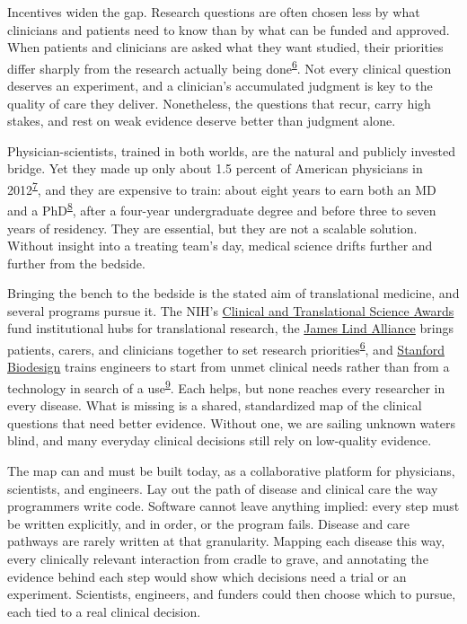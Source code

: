 \documentclass[12pt]{article}
\begin{document}
Incentives widen the gap. Research questions are often chosen less by what clinicians and patients need to know than by what can be funded and approved. When patients and clinicians are asked what they want studied, their priorities differ sharply from the research actually being done\textsuperscript{\hyperlink{ref-crowe2015}{6}}. Not every clinical question deserves an experiment, and a clinician's accumulated judgment is key to the quality of care they deliver. Nonetheless, the questions that recur, carry high stakes, and rest on weak evidence deserve better than judgment alone.

Physician-scientists, trained in both worlds, are the natural and publicly invested bridge. Yet they made up only about 1.5 percent of American physicians in 2012\textsuperscript{\hyperlink{ref-milewicz2015}{7}}, and they are expensive to train: about eight years to earn both an MD and a PhD\textsuperscript{\hyperlink{ref-brass2010}{8}}, after a four-year undergraduate degree and before three to seven years of residency. They are essential, but they are not a scalable solution. Without insight into a treating team's day, medical science drifts further and further from the bedside.

Bringing the bench to the bedside is the stated aim of translational medicine, and several programs pursue it. The NIH's \href{https://ncats.nih.gov/ctsa}{Clinical and Translational Science Awards} fund institutional hubs for translational research, the \href{https://www.jla.nihr.ac.uk/}{James Lind Alliance} brings patients, carers, and clinicians together to set research priorities\textsuperscript{\hyperlink{ref-crowe2015}{6}}, and \href{https://biodesign.stanford.edu/}{Stanford Biodesign} trains engineers to start from unmet clinical needs rather than from a technology in search of a use\textsuperscript{\hyperlink{ref-yock2015}{9}}. Each helps, but none reaches every researcher in every disease. What is missing is a shared, standardized map of the clinical questions that need better evidence. Without one, we are sailing unknown waters blind, and many everyday clinical decisions still rely on low-quality evidence.

The map can and must be built today, as a collaborative platform for physicians, scientists, and engineers. Lay out the path of disease and clinical care the way programmers write code. Software cannot leave anything implied: every step must be written explicitly, and in order, or the program fails. Disease and care pathways are rarely written at that granularity. Mapping each disease this way, every clinically relevant interaction from cradle to grave, and annotating the evidence behind each step would show which decisions need a trial or an experiment. Scientists, engineers, and funders could then choose which to pursue, each tied to a real clinical decision.
\end{document}
